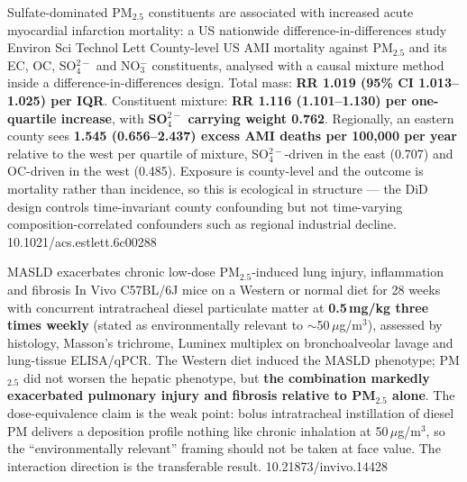\documentclass[10pt]{article}
\begin{document}
{Sulfate-dominated PM$_{2.5}$ constituents are associated with increased acute myocardial
infarction mortality: a US nationwide difference-in-differences study}
{Environ Sci Technol Lett}
{County-level US AMI mortality against PM$_{2.5}$ and its EC, OC, SO$_4^{2-}$ and
NO$_3^-$ constituents, analysed with a causal mixture method inside a
difference-in-differences design. Total mass: \textbf{RR 1.019 (95\% CI 1.013--1.025) per
IQR}. Constituent mixture: \textbf{RR 1.116 (1.101--1.130) per one-quartile increase},
with \textbf{SO$_4^{2-}$ carrying weight 0.762}. Regionally, an eastern county sees
\textbf{1.545 (0.656--2.437) excess AMI deaths per 100{,}000 per year} relative to the
west per quartile of mixture, SO$_4^{2-}$-driven in the east (0.707) and OC-driven in the
west (0.485). Exposure is county-level and the outcome is mortality rather than incidence,
so this is ecological in structure --- the DiD design controls time-invariant county
confounding but not time-varying composition-correlated confounders such as regional
industrial decline.}
{10.1021/acs.estlett.6c00288}


{MASLD exacerbates chronic low-dose PM$_{2.5}$-induced lung injury, inflammation and
fibrosis}
{In Vivo}
{C57BL/6J mice on a Western or normal diet for 28 weeks with concurrent intratracheal
diesel particulate matter at \textbf{0.5\,mg/kg three times weekly} (stated as
environmentally relevant to $\sim$50\,$\mu$g/m$^3$), assessed by histology, Masson's
trichrome, Luminex multiplex on bronchoalveolar lavage and lung-tissue ELISA/qPCR. The
Western diet induced the MASLD phenotype; PM$_{2.5}$ did not worsen the hepatic
phenotype, but \textbf{the combination markedly exacerbated pulmonary injury and fibrosis
relative to PM$_{2.5}$ alone}. The dose-equivalence claim is the weak point: bolus
intratracheal instillation of diesel PM delivers a deposition profile nothing like
chronic inhalation at 50\,$\mu$g/m$^3$, so the ``environmentally relevant'' framing should
not be taken at face value. The interaction direction is the transferable result.}
{10.21873/invivo.14428}

\clearpage

\end{document}

